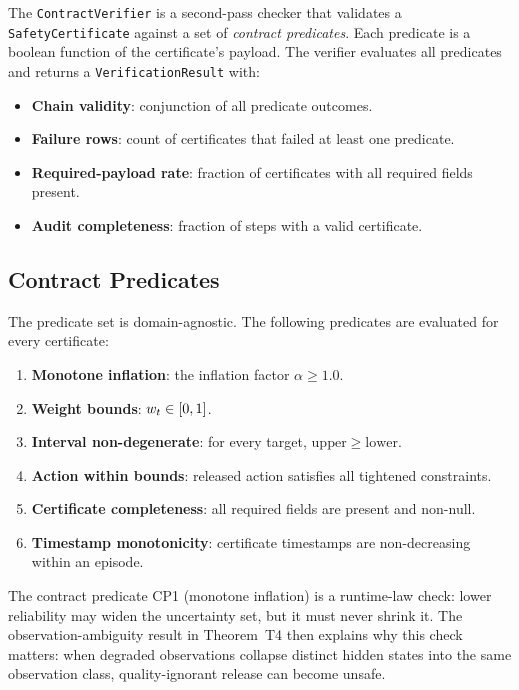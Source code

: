 The \texttt{ContractVerifier} is a second-pass checker that validates a
\texttt{SafetyCertificate} against a set of \emph{contract predicates}.  Each
predicate is a boolean function of the certificate's payload.  The verifier evaluates
all predicates and returns a \texttt{VerificationResult} with:
\begin{itemize}[nosep]
  \item \textbf{Chain validity}: conjunction of all predicate outcomes.
  \item \textbf{Failure rows}: count of certificates that failed at least one predicate.
  \item \textbf{Required-payload rate}: fraction of certificates with all
        required fields present.
  \item \textbf{Audit completeness}: fraction of steps with a valid certificate.
\end{itemize}

\subsection{Contract Predicates}

The predicate set is domain-agnostic.  The following predicates are evaluated for
every certificate:

\begin{enumerate}[label=\textbf{CP\arabic*},nosep]
  \item \textbf{Monotone inflation}: the inflation factor $\alpha \ge 1.0$.
  \item \textbf{Weight bounds}: $w_t \in [0, 1]$.
  \item \textbf{Interval non-degenerate}: for every target, $\mathrm{upper} \ge
        \mathrm{lower}$.
  \item \textbf{Action within bounds}: released action satisfies all tightened
        constraints.
  \item \textbf{Certificate completeness}: all required fields are present and
        non-null.
  \item \textbf{Timestamp monotonicity}: certificate timestamps are non-decreasing
        within an episode.
\end{enumerate}

The contract predicate CP1 (monotone inflation) is a runtime-law check: lower
reliability may widen the uncertainty set, but it must never shrink it.  The
observation-ambiguity result in Theorem~T4 then explains why this check matters:
when degraded observations collapse distinct hidden states into the same
observation class, quality-ignorant release can become unsafe.

